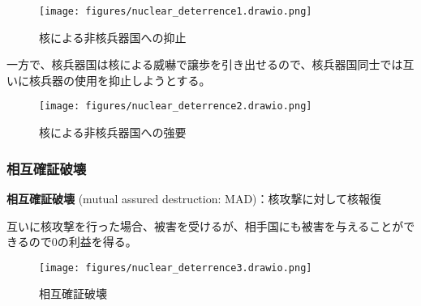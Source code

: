 \documentclass[
  xelatex,
  ja=standard]{bxjsarticle}
\begin{document}
\begin{figure}[htpb]

{\centering \texttt{[image: figures/nuclear\_deterrence1.drawio.png]}

}

\caption{核による非核兵器国への抑止}

\end{figure}

一方で、核兵器国は核による威嚇で譲歩を引き出せるので、核兵器国同士では互いに核兵器の使用を抑止しようとする。

\begin{figure}[htpb]

{\centering \texttt{[image: figures/nuclear\_deterrence2.drawio.png]}

}

\caption{核による非核兵器国への強要}

\end{figure}

\hypertarget{ux76f8ux4e92ux78baux8a3cux7834ux58ca}{%
\subsubsection{相互確証破壊}\label{ux76f8ux4e92ux78baux8a3cux7834ux58ca}}

\textbf{相互確証破壊} (mutual assured destruction:
MAD)：核攻撃に対して核報復

\begin{tcolorbox}[enhanced jigsaw, colback=white, leftrule=.75mm, bottomrule=.15mm, opacityback=0, opacitybacktitle=0.6, toptitle=1mm, bottomtitle=1mm, toprule=.15mm, coltitle=black, title=\textcolor{quarto-callout-tip-color}{\faLightbulb}\hspace{0.5em}{相互確証破壊}, titlerule=0mm, colbacktitle=quarto-callout-tip-color!10!white, breakable, arc=.35mm, colframe=quarto-callout-tip-color-frame, rightrule=.15mm, left=2mm]

互いに核攻撃を行った場合、被害を受けるが、相手国にも被害を与えることができるので0の利益を得る。

\end{tcolorbox}

\begin{figure}[htpb]

{\centering \texttt{[image: figures/nuclear\_deterrence3.drawio.png]}

}

\caption{相互確証破壊}

\end{figure}
\end{document}
